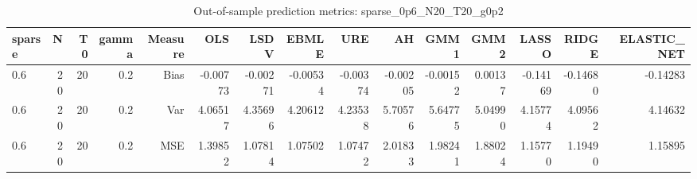 \begin{table}[!htbp]\centering
\caption{Out-of-sample prediction metrics: sparse_0p6_N20_T20_g0p2}
\label{tab:table3_sparse_0p6_N20_T20_g0p2}
\begin{tabular}{lrrrrrrrrrrrrrr}
\hline
sparse & N & T0 & gamma & Measure & OLS & LSDV & EBMLE & URE & AH & GMM1 & GMM2 & LASSO & RIDGE & ELASTIC_NET \\
\hline
0.6 & 20 & 20 & 0.2 & Bias & -0.00773 & -0.00271 & -0.00534 & -0.00374 & -0.00205 & -0.00152 & 0.00137 & -0.14169 & -0.14680 & -0.14283 \\
0.6 & 20 & 20 & 0.2 & Var & 4.06517 & 4.35696 & 4.20612 & 4.23538 & 5.70576 & 5.64775 & 5.04990 & 4.15774 & 4.09562 & 4.14632 \\
0.6 & 20 & 20 & 0.2 & MSE & 1.39852 & 1.07814 & 1.07502 & 1.07472 & 2.01833 & 1.98241 & 1.88024 & 1.15770 & 1.19490 & 1.15895 \\
\hline
\end{tabular}
\end{table}

